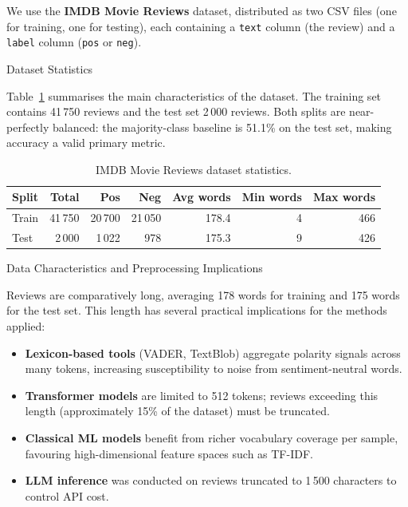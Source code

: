 \documentclass[12pt,reqno,twoside]{amsbook}
\makeatletter
\def\section{\@startsection{section}{1}%
      \z@{.5\linespacing\@plus.7\linespacing}{.25\linespacing}%
      {\normalfont\bfseries\flushleft}}
\theoremstyle{plain}
\numberwithin{equation}{chapter}
\numberwithin{section}{chapter}
\makeatother
\begin{document}
\noindent We use the \textbf{IMDB Movie Reviews} dataset, distributed as two CSV
files (one for training, one for testing), each containing a \texttt{text} column
(the review) and a \texttt{label} column (\texttt{pos} or \texttt{neg}).

\section{Dataset Statistics}

\noindent Table~\ref{tab:data} summarises the main characteristics of the dataset.
The training set contains 41\,750 reviews and the test set 2\,000 reviews.
Both splits are near-perfectly balanced: the majority-class baseline is 51.1\% on
the test set, making accuracy a valid primary metric.

\begin{table}[ht]
\centering
\caption{IMDB Movie Reviews dataset statistics.}
\label{tab:data}
\begin{tabular}{lrrrrrr}
\toprule
Split & Total & Pos & Neg & Avg words & Min words & Max words \\
\midrule
Train & 41\,750 & 20\,700 & 21\,050 & 178.4 & 4  & 466 \\
Test  &  2\,000 &  1\,022 &    978  & 175.3 & 9  & 426 \\
\bottomrule
\end{tabular}
\end{table}

\section{Data Characteristics and Preprocessing Implications}

\noindent Reviews are comparatively long, averaging 178 words for training and
175 words for the test set.
This length has several practical implications for the methods applied:

\begin{itemize}[noitemsep]
  \item \textbf{Lexicon-based tools} (VADER, TextBlob) aggregate polarity signals
        across many tokens, increasing susceptibility to noise from
        sentiment-neutral words.
  \item \textbf{Transformer models} are limited to 512 tokens; reviews exceeding
        this length (approximately 15\% of the dataset) must be truncated.
  \item \textbf{Classical ML models} benefit from richer vocabulary coverage per
        sample, favouring high-dimensional feature spaces such as TF-IDF.
  \item \textbf{LLM inference} was conducted on reviews truncated to 1\,500
        characters to control API cost.
\end{itemize}
\end{document}
